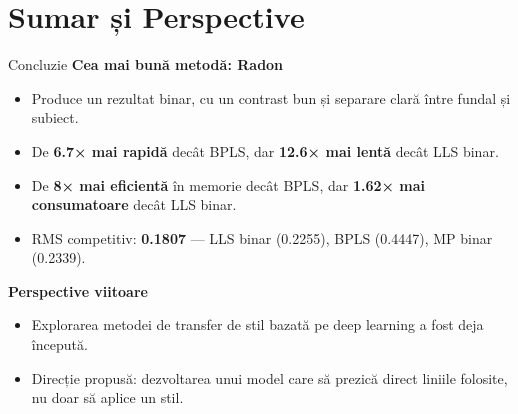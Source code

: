 \documentclass[aspectratio=169,xcolor=dvipsnames]{beamer}
\begin{document}
\section{Sumar și Perspective}
\begin{frame}{Concluzie}
    \textbf{Cea mai bună metodă: Radon}
    \begin{itemize}
        \item Produce un rezultat binar, cu un contrast bun și separare clară între fundal și subiect.
        \item De \textbf{6.7× mai rapidă} decât BPLS, dar \textbf{12.6× mai lentă} decât LLS binar.
        \item De \textbf{8× mai eficientă} în memorie decât BPLS, dar \textbf{1.62× mai consumatoare} decât LLS binar.
        \item RMS competitiv: \textbf{0.1807} —  LLS binar (0.2255), BPLS (0.4447), MP binar (0.2339).
    \end{itemize}

    \vspace{0.5cm}

    \textbf{Perspective viitoare}
    \begin{itemize}
        \item Explorarea metodei de transfer de stil bazată pe deep learning a fost deja începută.
        \item Direcție propusă: dezvoltarea unui model care să prezică direct liniile folosite, nu doar să aplice un stil.
    \end{itemize}
\end{frame}
\end{document}
